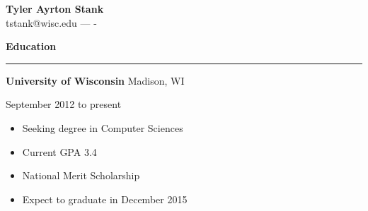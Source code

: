 \documentclass[12pt,letterpaper]{article}
\newenvironment{details}{
    \vspace{-.5em}
    \begin{itemize}
        \renewcommand \labelitemi{\labelitemiv}
        \setlength{\itemsep}{0pt}
        \setlength{\parskip}{-1pt}
        \setlength{\parsep}{0pt}
    }{
    \end{itemize}
    \vspace{-.5em}
}
\newcommand{\hr} {
    \vspace{-1em}
    \par\rule{\textwidth}{1pt}
    \vspace{-1.5em}
}
\newcommand{\ressection}[1] {
    \par{\large \textbf{#1}}
    \hr
}
\newenvironment{education} {
    \ressection{Education}
}{
    \vspace{0.5em}
}
\newcommand{\educator}[3] {
    \textbf{#1}
    \hfill #2
    \par #3
}
\begin{document}
\thispagestyle{empty}

\begin{flushright}
    {\large \textbf{Tyler Ayrton Stank}}\\
    tstank@wisc.edu ---  -
\end{flushright}

\begin{education}

\educator{University of Wisconsin}{Madison, WI}{September 2012 to present}
\begin{details}
    \item Seeking degree in Computer Sciences
    \item Current GPA 3.4
    \item National Merit Scholarship
    \item Expect to graduate in December 2015
\end{details}

\end{education}
\end{document}
